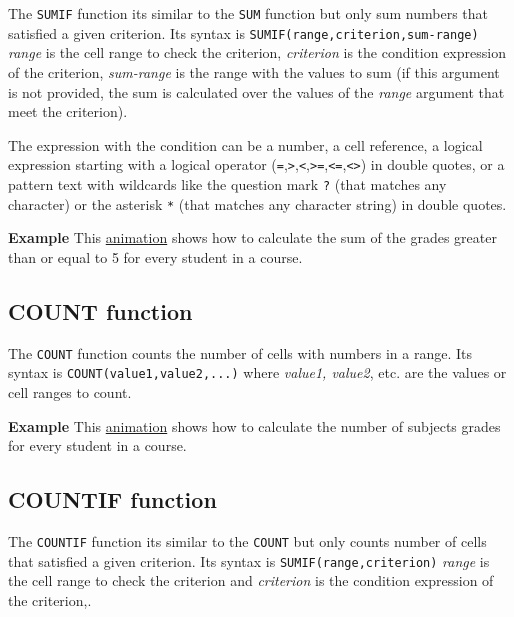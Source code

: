 The \texttt{SUMIF} function its similar to the \texttt{SUM} function but only sum numbers that satisfied a given
criterion.
Its syntax is \texttt{SUMIF(range,criterion,sum-range)} \emph{range} is the cell range to check the criterion,
\emph{criterion} is the condition expression of the criterion, \emph{sum-range} is the range with the values to sum (if
this argument is not provided, the sum is calculated over the values of the \emph{range} argument that meet the
criterion).

The expression with the condition can be a number, a cell reference, a logical expression starting with a logical
operator
(\texttt{=},\texttt{\textgreater{}},\texttt{\textless{}},\texttt{\textgreater{}=},\texttt{\textless{}=},\texttt{\textless{}\textgreater{}})
in double quotes, or a pattern text with wildcards like the question mark \texttt{?} (that matches any
character) or the asterisk \texttt{*} (that matches any character string) in double quotes. 

\textbf{Example} This \href{http://aprendeconalf.es/office/excel/manual/img/example_function_sumif.gif}{animation} shows how to calculate the sum of the grades greater than or equal to 5 for every student in a course.

\subsection{COUNT function}\hypertarget{count-function}{}\label{count-function}

The \texttt{COUNT} function counts the number of cells with numbers in a range.  Its syntax is
\texttt{COUNT(value1,value2,...)} where \emph{value1, value2}, etc. are the values or cell ranges to count.

\textbf{Example} This \href{http://aprendeconalf.es/office/excel/manual/img/example_function_count.gif}{animation} shows how to calculate the number of subjects grades for every student in a course.

\subsection{COUNTIF function}\hypertarget{countif-function}{}\label{countif-function}

The \texttt{COUNTIF} function its similar to the \texttt{COUNT} but only counts number of cells that satisfied a given criterion. Its syntax is \texttt{SUMIF(range,criterion)} \emph{range} is the cell range to check the criterion and \emph{criterion} is the condition expression of the criterion,.

